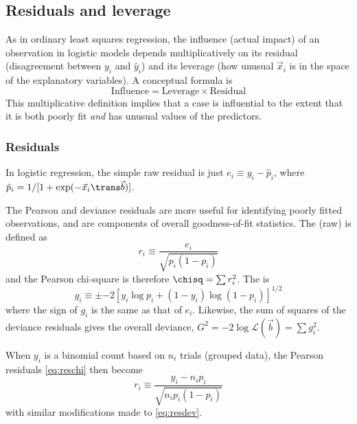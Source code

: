 \documentclass[11pt]{book}
\begin{document}
\subsection{Residuals and leverage}\label{sec:logist-resids}
As in ordinary least squares regression, the influence (actual impact)
of an observation in logistic models depends multiplicatively
on its residual (disagreement between $y_i$ and $\hat{y}_i$)
and its leverage (how unusual $\vec{x}_i$ is in the space of the
explanatory variables).
A conceptual formula is
\begin{equation*}
  \mathrm{Influence} = \mathrm{Leverage} \times \mathrm{Residual}
\end{equation*}
This multiplicative definition implies that a case is influential to
the extent that it is both poorly fit \emph{and} has unusual values of
the predictors.

\subsubsection{Residuals}
In logistic regression, the simple raw residual is just $e_i \equiv y_i - \hat{p}_i$,
where 
$ \hat{p}_i = 1 / [1 + \exp(- \vec{x}_i\trans \vec{b} )]$.

The  Pearson and deviance residuals are more useful for identifying
poorly fitted observations, and are components of overall goodness-of-fit
statistics.
The (raw)  is defined as
\begin{equation}\label{eq:reschi}
r_i \equiv \frac{e_i}{\sqrt{ p_i  (1-p_i)}}
\end{equation}
and the Pearson chi-square is therefore $\chisq = \sum r_i^2$.
The  is
\begin{equation}\label{eq:resdev}
g_i \equiv \pm { -2 [ y_i \log p_i  + (1-y_i) \log (1-p_i) ] }^{1/2}
\end{equation}
where the sign of $g_i$ is the same as that of $e_i$.
Likewise, the sum of squares of the deviance residuals gives
the overall deviance,
$G^2 = -2 \log \mathcal{L}(\vec{b}) = \sum g_i^2$.

When $y_i$ is a binomial count based on $n_i$ trials (grouped data),
the Pearson residuals \eqref{eq:reschi} then become
\begin{equation*}%
r_i \equiv \frac{y_i -n_i p_i}{\sqrt{n_i  p_i  (1-p_i)}}
\end{equation*}
with similar modifications made to \eqref{eq:resdev}.
\end{document}
